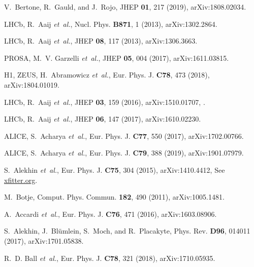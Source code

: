 \documentclass[12pt]{article}
\begin{document}
\begin{thebibliography}{99}
V.~Bertone, R.~Gauld, and J.~Rojo,
\newblock JHEP {\bf 01}, 217 (2019), arXiv:1808.02034.

LHCb, R.~Aaij {\em et~al.},
\newblock Nucl. Phys. {\bf B871}, 1 (2013), arXiv:1302.2864.

LHCb, R.~Aaij {\em et~al.},
\newblock JHEP {\bf 08}, 117 (2013), arXiv:1306.3663.

PROSA, M.~V. Garzelli {\em et~al.},
\newblock JHEP {\bf 05}, 004 (2017), arXiv:1611.03815.

H1, ZEUS, H.~Abramowicz {\em et~al.},
\newblock Eur. Phys. J. {\bf C78}, 473 (2018), arXiv:1804.01019.

LHCb, R.~Aaij {\em et~al.},
\newblock JHEP {\bf 03}, 159 (2016), arXiv:1510.01707,
.

LHCb, R.~Aaij {\em et~al.},
\newblock JHEP {\bf 06}, 147 (2017), arXiv:1610.02230.

ALICE, S.~Acharya {\em et~al.},
\newblock Eur. Phys. J. {\bf C77}, 550 (2017), arXiv:1702.00766.

ALICE, S.~Acharya {\em et~al.},
\newblock Eur. Phys. J. {\bf C79}, 388 (2019), arXiv:1901.07979.

S.~Alekhin {\em et~al.},
\newblock Eur. Phys. J. {\bf C75}, 304 (2015), arXiv:1410.4412,
\newblock See \url{xfitter.org}.

M.~Botje,
\newblock Comput. Phys. Commun. {\bf 182}, 490 (2011), arXiv:1005.1481.

A.~Accardi {\em et~al.},
\newblock Eur. Phys. J. {\bf C76}, 471 (2016), arXiv:1603.08906.

S.~Alekhin, J.~Bl{\"u}mlein, S.~Moch, and R.~Placakyte,
\newblock Phys. Rev. {\bf D96}, 014011 (2017), arXiv:1701.05838.

R.~D. Ball {\em et~al.},
\newblock Eur. Phys. J. {\bf C78}, 321 (2018), arXiv:1710.05935.


\end{thebibliography}
\end{document}
